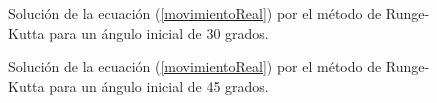 \documentclass[aps,twocolumn,secnumarabic,nobalancelastpage,amsmath,amssymb,nofootinbib]{revtex4-1}
\begin{document}
		\begin{figure}[!htb]
			\caption{Soluci\'on de la ecuaci\'on (\ref{movimientoReal}) por el m\'etodo de Runge-Kutta para un \'angulo inicial de 30 grados.}
			\label{fig:RK30}
		\end{figure}
	  
		\begin{figure}[!htb]
			\caption{Soluci\'on de la ecuaci\'on (\ref{movimientoReal}) por el m\'etodo de Runge-Kutta para un \'angulo inicial de 45 grados.}
			\label{fig:RK45}
		\end{figure} 
		
\end{document}
